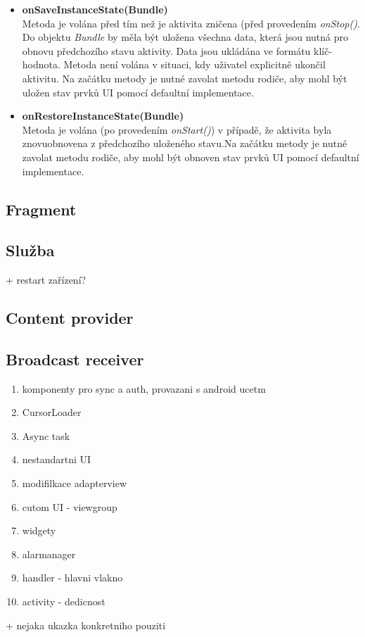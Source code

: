\documentclass{diplomka}
\begin{document}
\begin{itemize}[]
\item \textbf{onSaveInstanceState(Bundle)}\\
Metoda je volána před tím než je aktivita zničena (před provedením \emph{onStop()}. Do objektu \emph{Bundle} by měla být uložena všechna data, která jsou nutná pro obnovu předchozího stavu aktivity. Data jsou ukládána ve formátu klíč-hodnota. Metoda není volána v situaci, kdy uživatel explicitně ukončil aktivitu. Na začátku metody je nutné zavolat metodu rodiče, aby mohl být uložen stav prvků UI pomocí defaultní implementace.
\item \textbf{onRestoreInstanceState(Bundle)}\\
Metoda je volána (po provedením \emph{onStart()}) v případě, že aktivita byla znovuobnovena z předchozího uloženého stavu.Na začátku metody je nutné zavolat metodu rodiče, aby mohl být obnoven stav prvků UI pomocí defaultní implementace.
\end{itemize}


\subsection{Fragment}
\subsection{Služba}
+ restart zařízení?
\subsection{Content provider}
\subsection{Broadcast receiver}

\begin{enumerate}
\item komponenty pro sync a auth, provazani s android ucetm
\item CursorLoader
\item Async task
\item  nestandartni UI
\item modifilkace adapterview
\item cutom UI - viewgroup
\item widgety
\item alarmanager
\item handler - hlavni vlakno
\item activity - dedicnost
\end{enumerate}
+ nejaka ukazka konkretniho pouziti
\end{document}
